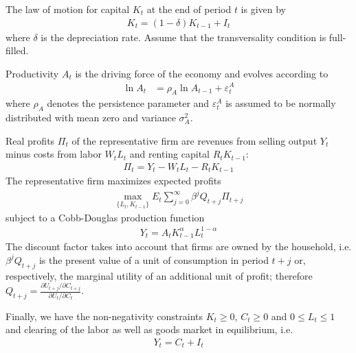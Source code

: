 \documentclass[a4paper]{scrartcl}
\begin{document}
The law of motion for capital $K_t$ at the end of period $t$ is given by
\begin{align*}
K_{t} = (1-\delta)K_{t-1} + I_t
\end{align*}
where $\delta$ is the depreciation rate. Assume that the transversality condition is full-filled.

Productivity $A_t$ is the driving force of the economy and evolves according to
\begin{align*}
\ln{A_{t}} &=\rho_A \ln{A_{t-1}}  + \varepsilon_t^A
\end{align*}
where $\rho_A$ denotes the persistence parameter and $\varepsilon_t^A$ is assumed to be normally distributed with mean zero and variance $\sigma_A^2$.

Real profits $\Pi_t$ of the representative firm are revenues from selling output $Y_t$ minus costs from labor $W_t L_t$ and renting capital $R_t K_{t-1}$:
\begin{align*}
\Pi_t = Y_{t} - W_{t} L_{t} - R_{t} K_{t-1}
\end{align*}	
The representative firm maximizes expected profits
\begin{align*}
\underset{\{L_{t},K_{t-1}\}}{\max} E_t \sum_{j=0}^{\infty} \beta^j Q_{t+j}\Pi_{t+j}
\end{align*}
subject to a Cobb-Douglas production function
\begin{align*}
 Y_t =  A_t K_{t-1}^\alpha L_t^{1-\alpha}
\end{align*}
The discount factor takes into account that firms are owned by the household, i.e. $\beta^j Q_{t+j}$ is the present value of a unit of consumption in period $t+j$ or, respectively, the marginal utility of an additional unit of profit; therefore $Q_{t+j}=\frac{\partial U_{t+j}/\partial C_{t+j}}{\partial U_{t}/\partial C_{t}}$.

Finally, we have the non-negativity constraints	$K_t \geq0$, $C_t \geq 0$ and $0\leq L_t \leq 1$ and clearing of the labor as well as goods market in equilibrium, i.e.
\begin{align*}
Y_t = C_t + I_t
\end{align*}
\end{document}

